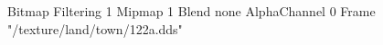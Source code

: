 {Bitmap
	{Filtering 1}
	{Mipmap 1}
	{Blend none}
	{AlphaChannel 0}
	{Frame "/texture/land/town/122a.dds"}
}
